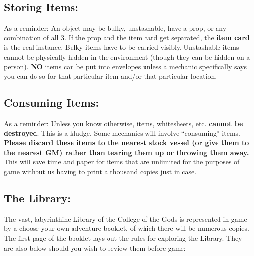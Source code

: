 \documentclass[sheet]{GL2020}
\begin{document}
{\subsection{Storing Items:}
As a reminder: An object may be bulky, unstashable, have a prop, or any combination of all 3. If the prop and the item card get separated, the \textbf{item card} is the real instance. Bulky items have to be carried visibly. Unstashable items cannot be physically hidden in the environment (though they can be hidden on a person). \textbf{NO} items can be put into envelopes unless a mechanic specifically says you can do so for that particular item and/or that particular location.

\subsection{Consuming Items:}
As a reminder: Unless you know otherwise, items, whitesheets, etc. \textbf{cannot be destroyed}. This is a kludge. Some mechanics will involve ``consuming'' items. \textbf{Please discard these items to the nearest stock vessel (or give them to the nearest GM) rather than tearing them up or throwing them away.} This will save time and paper for items that are unlimited for the purposes of game without us having to print a thousand copies just in case.}

\subsection{The Library:}
The vast, labyrinthine Library of the College of the Gods is represented in game by a choose-your-own adventure booklet, of which there will be numerous copies. The first page of the booklet lays out the rules for exploring the Library. They are also below should you wish to review them before game:
\end{document}
